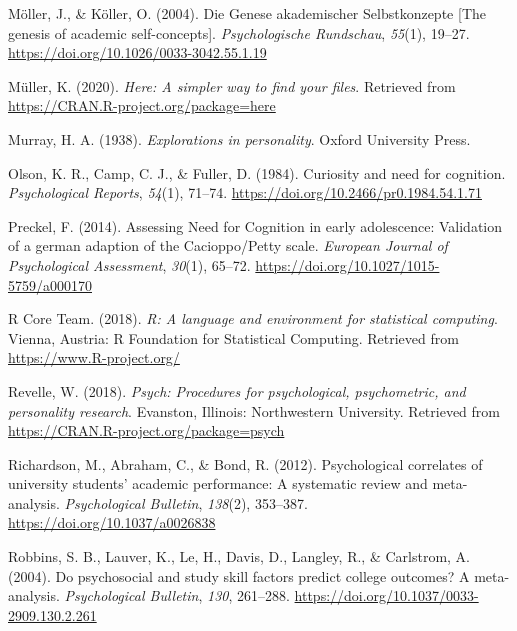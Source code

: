 \documentclass[
  man]{apa6}
\newlength{\cslhangindent}
\newlength{\cslentryspacingunit} %
\newenvironment{CSLReferences}[2] %
 {%
  \setlength{\parindent}{0pt}
  \ifodd #1
  \let\oldpar\par
  \def\par{\hangindent=\cslhangindent\oldpar}
  \fi
  \setlength{\parskip}{#2\cslentryspacingunit}
 }%
 {}
\begin{document}
\begin{CSLReferences}{1}{0}
\leavevmode{}%
Möller, J., \& Köller, O. (2004). {Die Genese akademischer Selbstkonzepte {[}The genesis of academic self-concepts{]}}. \emph{Psychologische Rundschau}, \emph{55}(1), 19--27. \url{https://doi.org/10.1026/0033-3042.55.1.19}

\leavevmode{}%
Müller, K. (2020). \emph{Here: A simpler way to find your files}. Retrieved from \url{https://CRAN.R-project.org/package=here}

\leavevmode{}%
Murray, H. A. (1938). \emph{Explorations in personality}. Oxford University Press.

\leavevmode{}%
Olson, K. R., Camp, C. J., \& Fuller, D. (1984). Curiosity and need for cognition. \emph{Psychological Reports}, \emph{54}(1), 71--74. \url{https://doi.org/10.2466/pr0.1984.54.1.71}

\leavevmode{}%
Preckel, F. (2014). Assessing {Need} for {Cognition} in early adolescence: Validation of a german adaption of the {Cacioppo}/{Petty} scale. \emph{European Journal of Psychological Assessment}, \emph{30}(1), 65--72. \url{https://doi.org/10.1027/1015-5759/a000170}

\leavevmode{}%
R Core Team. (2018). \emph{R: A language and environment for statistical computing}. Vienna, Austria: R Foundation for Statistical Computing. Retrieved from \url{https://www.R-project.org/}

\leavevmode{}%
Revelle, W. (2018). \emph{Psych: Procedures for psychological, psychometric, and personality research}. Evanston, Illinois: Northwestern University. Retrieved from \url{https://CRAN.R-project.org/package=psych}

\leavevmode{}%
Richardson, M., Abraham, C., \& Bond, R. (2012). Psychological correlates of university students' academic performance: A systematic review and meta-analysis. \emph{Psychological Bulletin}, \emph{138}(2), 353--387. \url{https://doi.org/10.1037/a0026838}

\leavevmode{}%
Robbins, S. B., Lauver, K., Le, H., Davis, D., Langley, R., \& Carlstrom, A. (2004). Do psychosocial and study skill factors predict college outcomes? A meta-analysis. \emph{Psychological Bulletin}, \emph{130}, 261--288. \url{https://doi.org/10.1037/0033-2909.130.2.261}


\end{CSLReferences}
\end{document}

